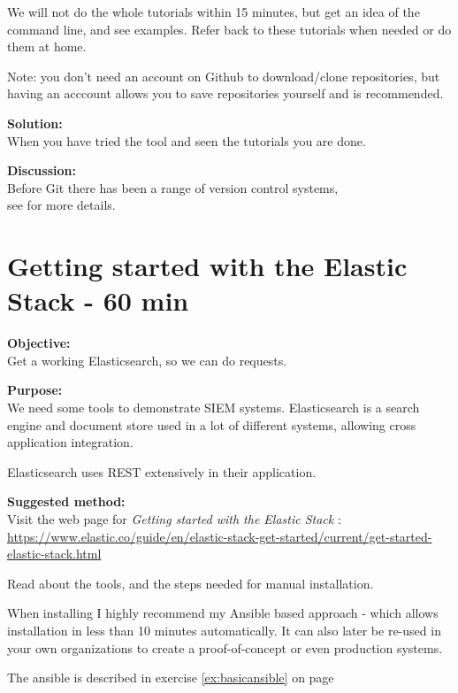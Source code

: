 \documentclass[a4paper,11pt,notitlepage]{report}
\begin{document}
We will not do the whole tutorials within 15 minutes, but get an idea of the command line, and see examples. Refer back to these tutorials when needed or do them at home.

Note: you don't need an account on Github to download/clone repositories, but having an acccount allows you to save repositories yourself and is recommended.

{\bf Solution:}\\
When you have tried the tool and seen the tutorials you are done.

{\bf Discussion:}\\
Before Git there has been a range of version control systems,\\
see  for more details.




\chapter{Getting started with the Elastic Stack - 60 min}
\label{gettingstartedelastic}



{\bf Objective:}\\
Get a working Elasticsearch, so we can do requests.

{\bf Purpose:}\\
We need some tools to demonstrate SIEM systems. Elasticsearch is a search engine and document store used in a lot of different systems, allowing cross application integration.

Elasticsearch uses REST extensively in their application.

{\bf Suggested method:}\\
Visit the web page for \emph{Getting started with the Elastic Stack} :\\
{\footnotesize\url{https://www.elastic.co/guide/en/elastic-stack-get-started/current/get-started-elastic-stack.html}}

Read about the tools, and the steps needed for manual installation.

When installing I highly recommend my Ansible based approach - which allows installation in less than 10 minutes automatically. It can also later be re-used in your own organizations to create a proof-of-concept or even production systems.

The ansible is described in exercise \ref{ex:basicansible} on page \pageref{ex:basicansible}
\end{document}
